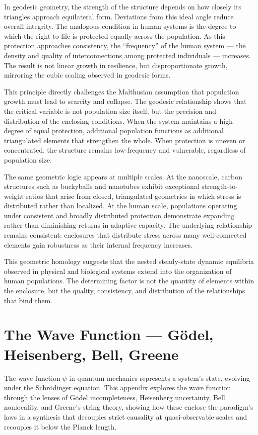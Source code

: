 In geodesic geometry, the strength of the structure depends on how closely its triangles approach equilateral form. Deviations from this ideal angle reduce overall integrity. The analogous condition in human systems is the degree to which the right to life is protected equally across the population. As this protection approaches consistency, the “frequency” of the human system — the density and quality of interconnections among protected individuals — increases. The result is not linear growth in resilience, but disproportionate growth, mirroring the cubic scaling observed in geodesic forms.

This principle directly challenges the Malthusian assumption that population growth must lead to scarcity and collapse. The geodesic relationship shows that the critical variable is not population size itself, but the precision and distribution of the enclosing conditions. When the system maintains a high degree of equal protection, additional population functions as additional triangulated elements that strengthen the whole. When protection is uneven or concentrated, the structure remains low-frequency and vulnerable, regardless of population size.

The same geometric logic appears at multiple scales. At the nanoscale, carbon structures such as buckyballs and nanotubes exhibit exceptional strength-to-weight ratios that arise from closed, triangulated geometries in which stress is distributed rather than localized. At the human scale, populations operating under consistent and broadly distributed protection demonstrate expanding rather than diminishing returns in adaptive capacity. The underlying relationship remains consistent: enclosures that distribute stress across many well-connected elements gain robustness as their internal frequency increases.

This geometric homology suggests that the nested steady-state dynamic equilibria observed in physical and biological systems extend into the organization of human populations. The determining factor is not the quantity of elements within the enclosure, but the quality, consistency, and distribution of the relationships that bind them.

\chapter{The Wave Function — Gödel, Heisenberg, Bell, Greene}

The wave function $\psi$ in quantum mechanics represents a system's state, evolving under the Schrödinger equation. This appendix explores the wave function through the lenses of Gödel incompleteness, Heisenberg uncertainty, Bell nonlocality, and Greene's string theory, showing how these enclose the paradigm's laws in a synthesis that decouples strict causality at quasi-observable scales and recouples it below the Planck length.

